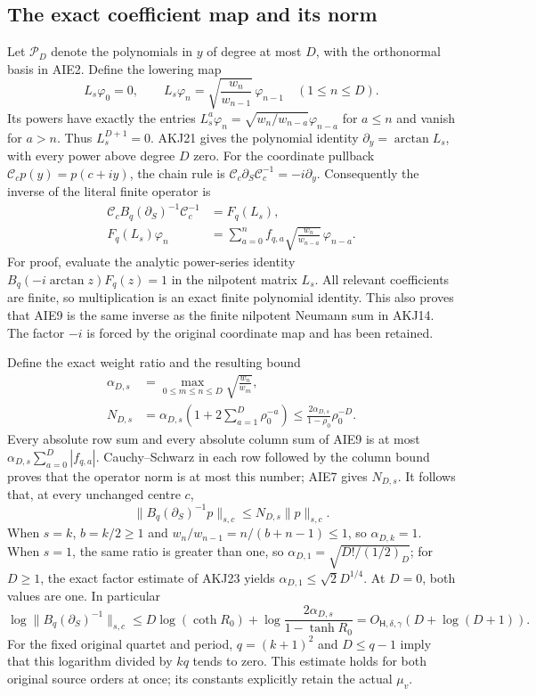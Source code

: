 \documentclass[11pt,a4paper]{article}
\begin{document}
\subsection{The exact coefficient map and its norm}

Let $\mathcal P_D$ denote the polynomials in $y$ of degree at most
$D$, with the orthonormal basis in AIE2. Define the lowering map
\[
 L_s\varphi_0=0,\qquad
 L_s\varphi_n=\sqrt{\frac{w_n}{w_{n-1}}}\,\varphi_{n-1}
                         \quad(1\le n\le D).
 \tag{AIE8}
\]
Its powers have exactly the entries
$L_s^a\varphi_n=\sqrt{w_n/w_{n-a}}\varphi_{n-a}$ for
$a\le n$ and vanish for $a>n$. Thus $L_s^{D+1}=0$.
AKJ21 gives the polynomial identity
$\partial_y=\arctan L_s$, with every power above degree $D$
zero. For the coordinate pullback $\mathcal C_c p(y)=p(c+iy)$,
the chain rule is
$\mathcal C_c\partial_S\mathcal C_c^{-1}=-i\partial_y$.
Consequently the inverse of the literal finite operator is
\[
 \begin{split}
 \mathcal C_c B_q(\partial_S)^{-1}\mathcal C_c^{-1}
   &=F_q(L_s),\\
 F_q(L_s)\varphi_n
   &=\sum_{a=0}^n f_{q,a}
                     \sqrt{\frac{w_n}{w_{n-a}}}\,\varphi_{n-a}.
 \end{split}\tag{AIE9}
\]
For proof, evaluate the analytic power-series identity
$B_q(-i\arctan z)F_q(z)=1$ in the nilpotent matrix $L_s$.
All relevant coefficients are finite, so multiplication is an exact
finite polynomial identity. This also proves that AIE9 is the same
inverse as the finite nilpotent Neumann sum in AKJ14. The factor $-i$
is forced by the original coordinate map and has been retained.

Define the exact weight ratio and the resulting bound
\[
 \begin{split}
 \alpha_{D,s}&=\max_{0\le m\le n\le D}
                         \sqrt{\frac{w_n}{w_m}},\\
 N_{D,s}&=\alpha_{D,s}
            \left(1+2\sum_{a=1}^{D}\rho_0^{-a}\right)
 \le \frac{2\alpha_{D,s}}{1-\rho_0}\rho_0^{-D}.
 \end{split}\tag{AIE10}
\]
Every absolute row sum and every absolute column sum of AIE9 is at
most $\alpha_{D,s}\sum_{a=0}^D|f_{q,a}|$. Cauchy--Schwarz in each
row followed by the column bound proves that the operator norm is
at most this number; AIE7 gives $N_{D,s}$. It follows that, at every
unchanged centre $c$,
\[
 \|B_q(\partial_S)^{-1}p\|_{s,c}
                \le N_{D,s}\|p\|_{s,c}.
 \tag{AIE11}
\]
When $s=k$, $b=k/2\ge1$ and
$w_n/w_{n-1}=n/(b+n-1)\le1$, so $\alpha_{D,k}=1$.
When $s=1$, the same ratio is greater than one, so
$\alpha_{D,1}=\sqrt{D!/(1/2)_D}$; for $D\ge1$, the exact
factor estimate of AKJ23 yields
$\alpha_{D,1}\le\sqrt2 D^{1/4}$. At $D=0$, both values are
one. In particular
\[
 \log\|B_q(\partial_S)^{-1}\|_{s,c}
 \le D\log(\coth R_0)
       +\log\frac{2\alpha_{D,s}}{1-\tanh R_0}
             =O_{\mathsf H,\delta,\gamma}(D+\log(D+1)).
 \tag{AIE12}
\]
For the fixed original quartet and period, $q=(k+1)^2$ and
$D\le q-1$ imply that this logarithm divided by $kq$ tends to
zero. This estimate holds for both original source orders at once;
its constants explicitly retain the actual $\mu_v$.
\end{document}
